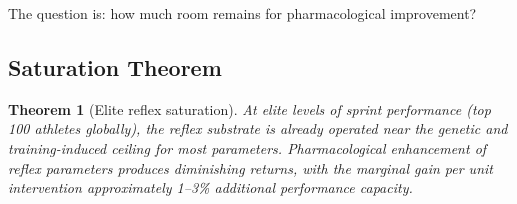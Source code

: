 \documentclass[11pt,twocolumn]{article}
\newtheorem{theorem}{Theorem}
\theoremstyle{definition}
\theoremstyle{remark}
\begin{document}
The question is: how much room remains for pharmacological improvement?

\subsection{Saturation Theorem}

\begin{theorem}[Elite reflex saturation]
\label{thm:saturation}
At elite levels of sprint performance (top 100 athletes globally), the reflex substrate is already operated near the genetic and training-induced ceiling for most parameters. Pharmacological enhancement of reflex parameters produces diminishing returns, with the marginal gain per unit intervention approximately 1--3\% additional performance capacity.
\end{theorem}
\end{document}
